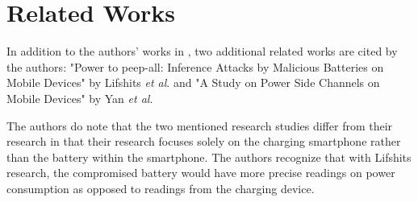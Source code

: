 \section{Related Works}
\label{sec:related}
In addition to the authors' works in \papertitle{}\cite{10.1145/3374664.3375732}, two additional related works are cited by the authors: "Power to peep-all: Inference Attacks by Malicious Batteries on Mobile Devices" by Lifshits \textit{et al}. \cite{lifshits2018power} and "A Study on Power Side Channels on Mobile Devices" by Yan \textit{et al}\cite{10.1145/2875913.2875934}.

The authors do note that the two mentioned research studies differ from their research in that their research focuses solely on the charging smartphone rather than the battery within the smartphone. The authors recognize that with Lifshits research, the compromised battery would have more precise readings on power consumption as opposed to readings from the charging device.